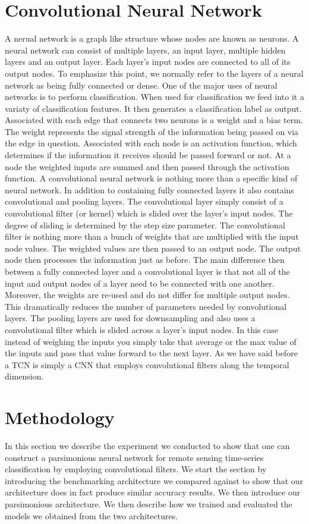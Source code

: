 \documentclass{article}
\begin{document}
 \section{Convolutional Neural Network}  
 A nerual network is a graph like structure whose nodes are known as neurons. A neural network can consist of multiple layers, an input layer, multiple hidden layers and an output layer. Each layer's input nodes are connected to all of its output nodes. To emphasize this point, we normally refer to the layers of a neural network as being fully connected or dense. One of the major uses of neural networks is to perform classification. When used for classification we feed into it a variaty of classification features. It then generates a classification label as output. Associated with each edge that connects two neurons is a weight and a bias term. The weight represents the signal strength of the information being passed on via the edge in question. Associated with each node is an activation function, which determines if the information it receives should be passed forward or not. At a node the weighted inputs are summed and then passed through the activation function. A convolutional neural network is nothing more than a specific kind of neural network. In addition to containing fully connected layers it also contains convolutional and pooling layers. The convolutional layer simply consist of a convolutional filter (or kernel) which is slided over the layer's input nodes. The degree of sliding is determined by the step size parameter. The convolutional filter is nothing more than a bunch of weights that are multiplied with the input node values. The weighted values are then passed to an output node. The output node then processes the information just as before. The main difference then between a fully connected layer and a convolutional layer is that not all of the input and output nodes of a layer need to be connected with one another. Moreover, the weights are re-used and do not differ for multiple output nodes. This dramatically reduces the number of parameters needed by convolutional layers. The pooling layers are used for downsampling and also uses a convolutional filter which is slided across a layer's input nodes. In this case instead of weighing the inputs you simply take that average or the max value of the inputs and pass that value forward to the next layer. As we have said before a TCN is simply a CNN that employs convolutional filters along the temporal dimension.  
 
\section{Methodology}
\label{sec:exp}
In this section we describe the experiment we conducted to show that one can construct a parsimonious neural network for remote sensing time-series classification by employing convolutional filters. We start the section by introducing the benchmarking architecture we compared against to show that our architecture does in fact produce similar accuracy results. We then introduce our parsimonious architecture. We then describe how we trained and evaluated the models we obtained from the two architectures. 
\end{document}
